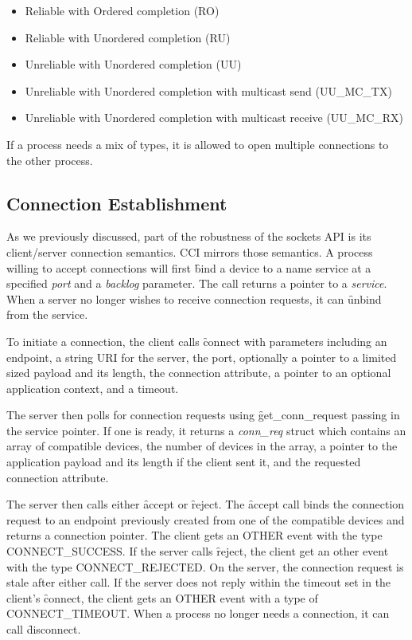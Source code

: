 \documentclass[conference]{IEEEtran}
\begin{document}
\begin{itemize}
\item Reliable with Ordered completion (RO)
\item Reliable with Unordered completion (RU)
\item Unreliable with Unordered completion (UU)
\item Unreliable with Unordered completion with multicast send (UU\_MC\_TX)
\item Unreliable with Unordered completion with multicast receive (UU\_MC\_RX)
\end{itemize}

If a process needs a mix of types, it is allowed to open multiple connections to the other
process.

\subsection{Connection Establishment}
As we previously discussed, part of the robustness of the sockets API is its client/server
connection semantics. CCI mirrors those semantics. A process willing to accept connections
will first \f{bind} a device to a name service at a specified \emph{port} and a
\emph{backlog} parameter. The call returns a pointer to a \emph{service}. When a server no
longer wishes to receive connection requests, it can \f{unbind} from the service.

To initiate a connection, the client calls \f{connect} with parameters including an
endpoint, a string URI for the server, the port, optionally a pointer to a limited sized
payload and its length, the connection attribute, a pointer to an optional application
context, and a timeout.

The server then polls for connection requests using \f{get\_conn\_request} passing in the
service pointer. If one is ready, it returns a \emph{conn\_req} struct which contains an
array of compatible devices, the number of devices in the array, a pointer to the
application payload and its length if the client sent it, and the requested connection
attribute.

The server then calls either \f{accept} or \f{reject}. The \f{accept} call binds the
connection request to an endpoint previously created from one of the compatible devices
and returns a connection pointer. The client gets an OTHER event with the type
CONNECT\_SUCCESS. If the server calls \f{reject}, the client get an other event with the
type CONNECT\_REJECTED.  On the server, the connection request is stale after either call.
If the server does not reply within the timeout set in the client's \f{connect}, the
client gets an OTHER event with a type of CONNECT\_TIMEOUT. When a process no longer needs
a connection, it can call \f{disconnect}.
\end{document}
